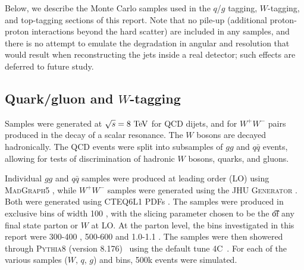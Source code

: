 Below, we describe the Monte Carlo samples used in the $q$/$g$ tagging,
$W$-tagging, and top-tagging sections of this report. Note
that no pile-up (additional proton-proton
interactions beyond the hard scatter) are included in any samples, and there is no
attempt to emulate the degradation in angular and \pt resolution that
would result when reconstructing the jets inside a real detector; such effects are deferred to 
future study.


\subsection{Quark/gluon and $W$-tagging}

Samples were generated at $\sqrt{s} = 8\TeV$ for QCD dijets, and for $W^+W^-$
pairs produced in the decay of a scalar resonance. The $W$ bosons are
decayed hadronically. The QCD events were split into subsamples of $gg$ and
$q\bar{q}$ events, allowing for tests of discrimination of hadronic $W$ bosons,
quarks, and gluons.

Individual $gg$ and $q\bar{q}$ samples were produced at leading order (LO)
using \textsc{MadGraph5} \cite{Alwall:2011uj}, while $W^+W^-$ samples were generated
using the \textsc{JHU Generator} \cite{Gao:2010qx,Bolognesi:2012mm,Anderson:2013afp}.
Both were generated using \textsc{CTEQ6L1} PDFs \cite{Pumplin:2002vw}. The samples
were produced in exclusive \pt bins of width 100 \GeV, with the slicing parameter
chosen to be the \t of any final state parton or $W$ at LO. At the parton level,
the \pt bins investigated in this report were 300-400 \GeV, 500-600 \GeV and
1.0-1.1 \TeV. 
The samples were then showered through \textsc{Pythia8}
(version 8.176)~\cite{Sjostrand:2007gs} using the default tune
4C~\cite{Buckley:2011ms}. For each of the various samples ($W,\,q,\,g$) and \pt bins,
500k events were simulated.





